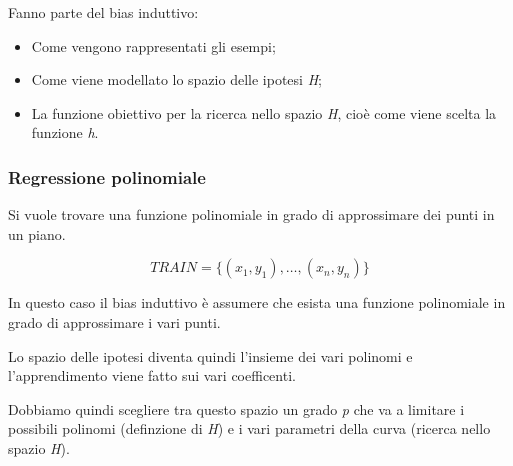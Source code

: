 Fanno parte del bias induttivo:

\begin{itemize}
\item
  Come vengono rappresentati gli esempi;
\item
  Come viene modellato lo spazio delle ipotesi \emph{H};
\item
  La funzione obiettivo per la ricerca nello spazio \emph{H}, cioè come
  viene scelta la funzione \emph{h}.
\end{itemize}

\subsubsection{Regressione polinomiale}\label{es-regressione-polinomiale}

Si vuole trovare una funzione polinomiale in grado di approssimare dei punti in un piano.

$$
TRAIN = \{(x_1,y_1),\ldots{},(x_n,y_n)\}
$$

In questo caso il bias induttivo è assumere che esista una funzione
polinomiale in grado di approssimare i vari punti.

Lo spazio delle ipotesi diventa quindi l'insieme dei vari polinomi e
l'apprendimento viene fatto sui vari coefficenti.

Dobbiamo quindi scegliere tra questo spazio un grado \emph{p} che va a
limitare i possibili polinomi (definzione di \emph{H}) e i vari
parametri della curva (ricerca nello spazio \emph{H}).
